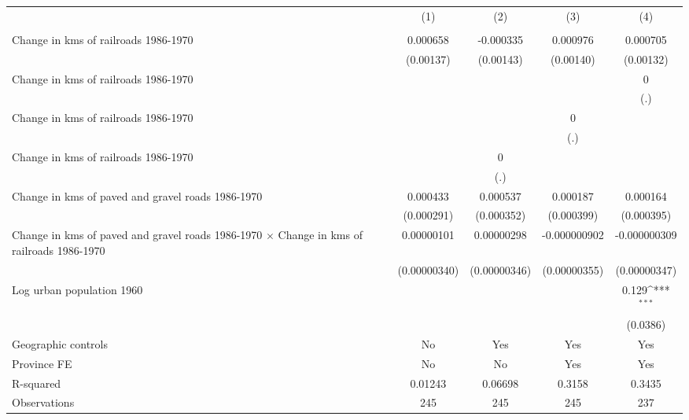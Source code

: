 {
\def\sym#1{\ifmmode^{#1}\else\(^{#1}\)\fi}
\begin{tabular}{l*{4}{c}}
\hline\hline
                &\multicolumn{1}{c}{(1)}&\multicolumn{1}{c}{(2)}&\multicolumn{1}{c}{(3)}&\multicolumn{1}{c}{(4)}\\
                &\multicolumn{1}{c}{}&\multicolumn{1}{c}{}&\multicolumn{1}{c}{}&\multicolumn{1}{c}{}\\
\hline
Change in kms of railroads 1986-1970& 0.000658         &-0.000335         & 0.000976         & 0.000705         \\
                &(0.00137)         &(0.00143)         &(0.00140)         &(0.00132)         \\
[1em]
Change in kms of railroads 1986-1970&                  &                  &                  &        0         \\
                &                  &                  &                  &      (.)         \\
[1em]
Change in kms of railroads 1986-1970&                  &                  &        0         &                  \\
                &                  &                  &      (.)         &                  \\
[1em]
Change in kms of railroads 1986-1970&                  &        0         &                  &                  \\
                &                  &      (.)         &                  &                  \\
[1em]
Change in kms of paved and gravel roads 1986-1970& 0.000433         & 0.000537         & 0.000187         & 0.000164         \\
                &(0.000291)         &(0.000352)         &(0.000399)         &(0.000395)         \\
[1em]
Change in kms of paved and gravel roads 1986-1970 $\times$ Change in kms of railroads 1986-1970&0.00000101         &0.00000298         &-0.000000902         &-0.000000309         \\
                &(0.00000340)         &(0.00000346)         &(0.00000355)         &(0.00000347)         \\
[1em]
Log urban population 1960&                  &                  &                  &    0.129\sym{***}\\
                &                  &                  &                  & (0.0386)         \\
\hline
Geographic controls&       No         &      Yes         &      Yes         &      Yes         \\
Province FE     &       No         &       No         &      Yes         &      Yes         \\
R-squared       &  0.01243         &  0.06698         &   0.3158         &   0.3435         \\
Observations    &      245         &      245         &      245         &      237         \\
\hline\hline
\end{tabular}
}
